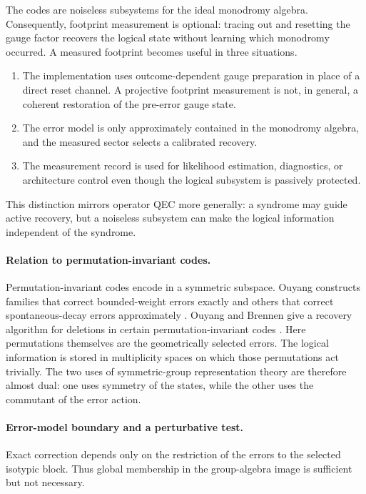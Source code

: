 \documentclass[11pt]{article}
\theoremstyle{definition}
\theoremstyle{remark}
\begin{document}
The codes are noiseless subsystems for the ideal monodromy algebra.  Consequently, footprint measurement is optional: tracing out and resetting the gauge factor recovers the logical state without learning which monodromy occurred.  A measured footprint becomes useful in three situations.
\begin{enumerate}
\item The implementation uses outcome-dependent gauge preparation in place of a direct reset channel.  A projective footprint measurement is not, in general, a coherent restoration of the pre-error gauge state.
\item The error model is only approximately contained in the monodromy algebra, and the measured sector selects a calibrated recovery.
\item The measurement record is used for likelihood estimation, diagnostics, or architecture control even though the logical subsystem is passively protected.
\end{enumerate}
This distinction mirrors operator QEC more generally: a syndrome may guide active recovery, but a noiseless subsystem can make the logical information independent of the syndrome.

\paragraph{Relation to permutation-invariant codes.}

Permutation-invariant codes encode in a symmetric subspace.  Ouyang constructs families that correct bounded-weight errors exactly and others that correct spontaneous-decay errors approximately \cite{Ouyang2014}.  Ouyang and Brennen give a recovery algorithm for deletions in certain permutation-invariant codes \cite{OuyangBrennen2026}.  Here permutations themselves are the geometrically selected errors.  The logical information is stored in multiplicity spaces on which those permutations act trivially.  The two uses of symmetric-group representation theory are therefore almost dual: one uses symmetry of the states, while the other uses the commutant of the error action.

\paragraph{Error-model boundary and a perturbative test.}

Exact correction depends only on the restriction of the errors to the selected isotypic block.  Thus global membership in the group-algebra image is sufficient but not necessary.
\end{document}
